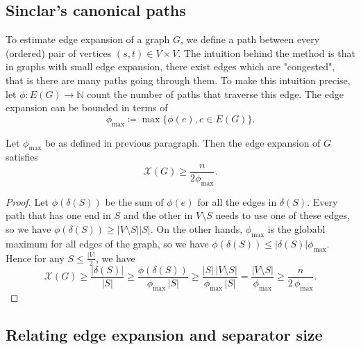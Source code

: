 \subsection{Sinclar's canonical paths}

To estimate edge expansion of a graph $G$, we define a path between every (ordered) pair of vertices $(s,t) \in V \times V$.
The intuition behind the method is that in graphs with small edge expansion, there exist edges which are "congested", that is there
are many paths going through them. To make this intuition precise, let $\phi: E(G) \rightarrow \mathbb{N}$ count the number of paths
that traverse this edge. The edge expansion can be bounded 
in terms of
\begin{equation}
\phi_{\max} \coloneqq \max \{ \phi(e), e \in E(G) \}.
\end{equation}


\begin{lemma}
\label{Sinclair}
Let $\phi_{\max}$ be as defined in previous paragraph. Then the edge expansion of $G$ satisfies 
\begin{equation}
\mathcal{X}(G) \ge \frac{n}{2 \phi_{\max}}.
\end{equation}
\end{lemma}

\begin{proof}
Let $\phi(\delta(S))$ be the sum of $\phi(e)$ for all the edges in $\delta(S)$. Every path that has one end in $S$
and the other in $V\setminus S$ needs to use one of these edges, so we have $\phi(\delta(S)) \ge   |V\setminus S | |S |$.
On the other hands, $\phi_{\max}$ is the globabl maximum for all edges of the graph, so we have $\phi(\delta(S)) \le  |\delta(S) |\phi_{\max}$.
Hence for any $S \le \frac{ |V |}{2}$, we have
\begin{equation}
\label{sepbound}
 \mathcal{X}(G) \ge \frac{|\delta(S)|}{|S|} 
                \ge \frac{\phi(\delta(S))}{\phi_{\max}\,|S|}
                \ge \frac{|S|\,|V{\setminus}S|}{\phi_{\max}\,|S|}
                 =  \frac{|V{\setminus}S|}{\phi_{\max}}
				\ge \frac{n}{2\,\phi_{\max}}.
\end{equation}
\end{proof} 
\subsection{Relating edge expansion and separator size}


